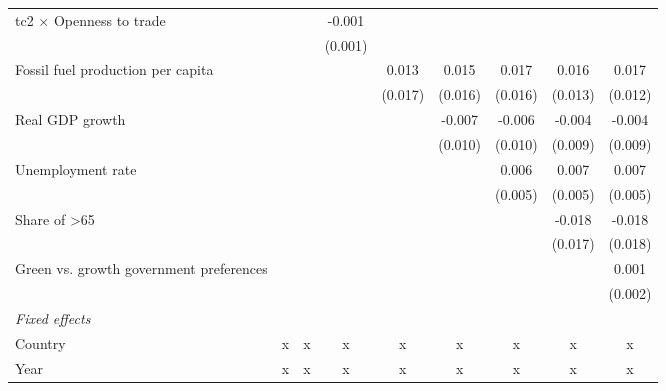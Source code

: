 \begin{table}[htbp]
\begin{tabular}{lcccccccc}
      tc2 $\times$ Openness to trade          &                &                & -0.001  &         &         &         &         &   \\   
                                              &                &                & (0.001) &         &         &         &         &   \\   
      Fossil fuel production per capita       &                &                &         & 0.013   & 0.015   & 0.017   & 0.016   & 0.017\\   
                                              &                &                &         & (0.017) & (0.016) & (0.016) & (0.013) & (0.012)\\   
      Real GDP growth                         &                &                &         &         & -0.007  & -0.006  & -0.004  & -0.004\\   
                                              &                &                &         &         & (0.010) & (0.010) & (0.009) & (0.009)\\   
      Unemployment rate                       &                &                &         &         &         & 0.006   & 0.007   & 0.007\\   
                                              &                &                &         &         &         & (0.005) & (0.005) & (0.005)\\   
      Share of >65                            &                &                &         &         &         &         & -0.018  & -0.018\\   
                                              &                &                &         &         &         &         & (0.017) & (0.018)\\   
      Green vs. growth government preferences &                &                &         &         &         &         &         & 0.001\\   
                                              &                &                &         &         &         &         &         & (0.002)\\   
      \emph{Fixed effects}\\
      Country                                 & x              & x              & x       & x       & x       & x       & x       & x\\  
      Year                                    & x              & x              & x       & x       & x       & x       & x       & x\\  

\end{tabular}
\end{table}
